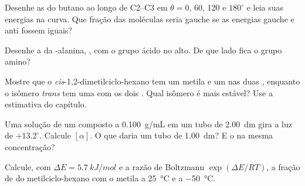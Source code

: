 \begin{exercise}[$\star\star$]\label{exo:b1:stereochemistry-in-depth:5}
Desenhe as  do butano ao longo de C2--C3 em
$\theta = 0$, 60, 120 e $180^\circ$ e leia suas energias na curva. Que
fração das moléculas seria gauche se as energias gauche e anti fossem
iguais?
\end{exercise}

\begin{exercise}[$\star\star$]\label{exo:b1:stereochemistry-in-depth:6}
Desenhe a  da -alanina,
, com o grupo ácido no alto. De que lado fica o
grupo amino?
\end{exercise}

\begin{exercise}[$\star\star$]\label{exo:b1:stereochemistry-in-depth:7}
Mostre que o \textit{cis}-1,2-dimetilciclo-hexano tem um metila  e
um  nas duas , enquanto o isômero \textit{trans} tem
uma  com os dois . Qual isômero é mais estável? Use a
estimativa do capítulo.
\end{exercise}

\begin{exercise}[$\star\star$]\label{exo:b1:stereochemistry-in-depth:8}
Uma solução de um composto  a \qty{0.100}{g/mL} em um tubo de
\qty{2.00}{dm} gira a luz de $+13.2^\circ$. Calcule $[\alpha]$. O que
daria um tubo de \qty{1.00}{dm}? E o  na mesma concentração?
\end{exercise}

\begin{exercise}[$\star\star$]\label{exo:b1:stereochemistry-in-depth:9}
Calcule, com $\Delta E = \qty{5.7}{kJ/mol}$ e a razão de Boltzmann
$\exp(\Delta E/RT)$, a fração de  do metilciclo-hexano com o
metila  a \qty{25}{\celsius} e a \qty{-50}{\celsius}.
\end{exercise}


